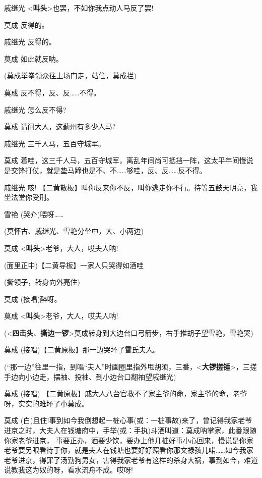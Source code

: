 戚继光
\textless{}\textbf{叫头}\textgreater{}也罢，不如你我点动人马反了罢!

莫成 反得的。

戚继光 反得的。

莫成 如此就反呐。

(莫成举拳领众往上场门走，站住，莫成拦)

莫成 反不得，反、反\ldots{}\ldots{}不得。

戚继光 怎么反不得?

莫成 请问大人，这蓟州有多少人马?

戚继光 三千人马，五百守城军。

莫成
着哇，这三千人马，五百守城军，离乱年间尚可抵挡一阵，这太平年间慢说是交锋打仗，就是垫马蹄也是不、不\ldots{}\ldots{}够哇，反、反\ldots{}\ldots{}反不得。

戚继光 咳!
【二黄散板】叫你反来你不反，叫你逃走你不行。待等五鼓天明亮，我坐法堂你受刑。

雪艳 (哭介)喂呀\ldots{}\ldots{}

(莫怀古、戚继光、雪艳分坐中，大、小两边)

莫成 \textless{}\textbf{叫头}\textgreater{}老爷，大人，哎夫人呐!

(面里正中)【二黄导板】一家人只哭得如酒哇

(撕领子，转身向外亮住)

莫成 (接唱)醉呀。

莫成 \textless{}\textbf{叫头}\textgreater{}老爷，大人，哎夫人呐!

(\textless{}\textbf{四击头}、\textbf{撕边一锣}\textgreater{}莫成转身到大边台口弓箭步，右手推胡子望雪艳，雪艳哭)

莫成 (接唱)【二黄原板】那一边哭坏了雪氏夫人。

(``那一边''往里一指，到唱``夫人''时画圈里指外甩胡须，三番，\textless{}\textbf{大锣搓锤}\textgreater{}，三搓手边向小边走，摆袖、投袖、到小边台口翻袖望戚继光)

莫成 (接唱)
【二黄原板】戚大人八台官救不了家主爷的命，家主爷的命，老爷呀，实实的难坏了小莫成。

莫成
(白)且住!事到如今我倒想起一桩心事(或：一桩事故)来了，曾记得我家老爷进京之时，大夫人在钱塘府中，手举(或：手执)斗酒叫道：莫成呐掌家，此番跟随你家老爷进京，
事要正办，酒要少饮，要办上他几桩好事小心回来，慢说是你家老爷要另眼看待于你，就是夫人在钱塘也要好好照看你那文禄孩儿喏\ldots{}\ldots{}如今我家老爷进京，得罪了汤勤狗男女，害得我家老爷有这样的杀身大祸，事到如今，难道说教我这为奴的呀，看水流舟不成。哎呀!

